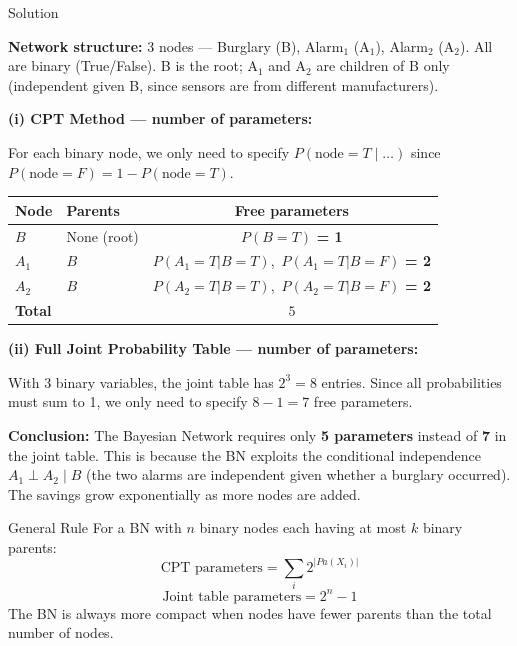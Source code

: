 \documentclass[12pt,a4paper]{article}
\begin{document}
\begin{solbox}{Solution}

\textbf{Network structure:} 3 nodes — Burglary (B), Alarm$_1$ (A$_1$), Alarm$_2$ (A$_2$). All are binary (True/False). B is the root; A$_1$ and A$_2$ are children of B only (independent given B, since sensors are from different manufacturers).

\medskip
\textbf{(i) CPT Method --- number of parameters:}

For each binary node, we only need to specify $P(\text{node}=T \mid \ldots)$ since $P(\text{node}=F) = 1 - P(\text{node}=T)$.

\begin{center}
\begin{tabular}{llc}
\toprule
\textbf{Node} & \textbf{Parents} & \textbf{Free parameters} \\
\midrule
$B$ & None (root) & $P(B{=}T)$ \hspace{1em} \textbf{= 1} \\
$A_1$ & $B$ & $P(A_1{=}T|B{=}T)$,\ $P(A_1{=}T|B{=}F)$ \hspace{1em} \textbf{= 2} \\
$A_2$ & $B$ & $P(A_2{=}T|B{=}T)$,\ $P(A_2{=}T|B{=}F)$ \hspace{1em} \textbf{= 2} \\
\midrule
\textbf{Total} & & $\boxed{5}$ \\
\bottomrule
\end{tabular}
\end{center}

\textbf{(ii) Full Joint Probability Table --- number of parameters:}

With 3 binary variables, the joint table has $2^3 = 8$ entries. Since all probabilities must sum to 1, we only need to specify $8 - 1 = \boxed{7}$ free parameters.

\medskip
\textbf{Conclusion:} The Bayesian Network requires only \textbf{5 parameters} instead of \textbf{7} in the joint table. This is because the BN exploits the conditional independence $A_1 \perp A_2 \mid B$ (the two alarms are independent given whether a burglary occurred). The savings grow exponentially as more nodes are added.

\begin{keybox}{General Rule}
For a BN with $n$ binary nodes each having at most $k$ binary parents:
\[
\text{CPT parameters} = \sum_i 2^{|Pa(X_i)|}
\]
\[
\text{Joint table parameters} = 2^n - 1
\]
The BN is always more compact when nodes have fewer parents than the total number of nodes.
\end{keybox}

\end{solbox}
\end{document}
